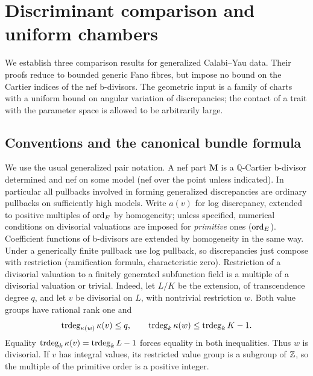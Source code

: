 \section{Discriminant comparison and uniform chambers}\label{sec:A}

We establish three comparison results for generalized Calabi--Yau data.
Their proofs reduce to bounded generic Fano fibres, but impose no bound on
the Cartier indices of the nef b-divisors.
The geometric input is a family of charts with a uniform bound on angular
variation of discrepancies; the contact of a trait with the parameter
space is allowed to be arbitrarily large.

\subsection{Conventions and the canonical bundle formula}

We use the usual generalized pair notation.
A nef part \(\mathbf M\) is a \(\mathbb Q\)-Cartier b-divisor determined and nef on some model (nef over the point unless indicated).
In particular all pullbacks involved in forming generalized discrepancies are ordinary pullbacks on sufficiently high models.
Write \(a(v)\) for log discrepancy, extended to positive multiples of \({\rm ord}_E\) by homogeneity; unless specified, numerical conditions on divisorial valuations are imposed for \emph{primitive} ones (\({\rm ord}_E\)).
Coefficient functions of b-divisors are extended by homogeneity in the same way.
Under a generically finite pullback use log pullback, so discrepancies just compose with restriction (ramification formula, characteristic zero).
Restriction of a divisorial valuation to a finitely generated subfunction
field is a multiple of a divisorial valuation or trivial.
Indeed, let \(L/K\) be the extension, of transcendence degree \(q\), and
let \(v\) be divisorial on \(L\), with nontrivial restriction \(w\).
Both value groups have rational rank one and
\[
 \operatorname{trdeg}_{\kappa(w)}\kappa(v)\le q,
 \qquad \operatorname{trdeg}_k\kappa(w)\le\operatorname{trdeg}_k K-1.
\]
Equality \(\operatorname{trdeg}_k\kappa(v)=\operatorname{trdeg}_k L-1\) forces equality in
both inequalities.  Thus \(w\) is divisorial.  If \(v\) has integral
values, its restricted value group is a subgroup of \(\mathbb Z\), so the
multiple of the primitive order is a positive integer.

